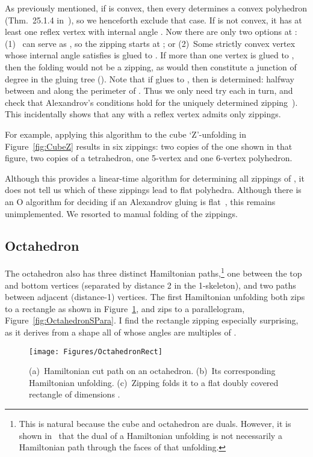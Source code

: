 \pdfoutput=1  \documentclass[]{article}
\newcommand{\figlab}[1]{\label{fig:#1}}
\newcommand{\figref}[1]{\ref{fig:#1}}
\begin{document}
As previously mentioned, if  is convex, then every  determines a
convex polyhedron (Thm.~25.1.4 in~\cite{do-gfalop-07}), so we henceforth exclude that case.
If  is not convex, it has at least one reflex vertex  with
internal angle .
Now there are only two options at :
(1)~ can serve as , so the zipping starts at ; or
(2)~Some strictly convex vertex  whose internal angle 
satisfies  is glued to .
If more than one vertex is glued to , then the folding would not be
a zipping, as  would then constitute a junction of degree 
in the gluing tree (\cite[Sec.~25.3]{do-gfalop-07}).
Note that if  glues to , then  is determined: halfway between 
and  along the perimeter of .
Thus we only need try each  in turn, and check that
Alexandrov's conditions hold for the uniquely determined zipping~\cite[Thm.~23.3.1]{do-gfalop-07}).
This incidentally shows that any  with a reflex vertex admits
only  zippings.

For example, applying this algorithm to the cube `Z'-unfolding
in Figure~\figref{CubeZ} results in six zippings: two copies of the
one shown in that figure, two copies of a tetrahedron, one
5-vertex and one 6-vertex polyhedron.

Although this provides a linear-time algorithm for determining all
zippings of , it does not tell us which of these zippings lead
to flat polyhedra.
Although there is an O algorithm for deciding if an
Alexandrov gluing is flat~\cite{o-ofpat-10}, this remains
unimplemented.
We resorted to manual folding of the zippings.

\subsection{Octahedron}
The octahedron also has three distinct Hamiltonian paths,\footnote{
   This is natural because the cube and octahedron are duals.
   However, it is shown in~\cite[Fig.~4]{lddss-zupc-10}
   that the dual of a Hamiltonian unfolding is not necessarily
   a Hamiltonian path through the faces of that unfolding.
}
one between
the top and bottom vertices (separated by distance 2 in the
1-skeleton), and two paths between adjacent (distance-1) vertices.
The first Hamiltonian unfolding both zips to a rectangle as shown
in Figure~\figref{OctahedronRect},
and zips to a parallelogram, Figure~\figref{OctahedronSPara}.
I find the rectangle zipping especially surprising, as it derives from
a shape all of whose angles are multiples of .
\begin{figure}[htbp]
\centering
\texttt{[image: Figures/OctahedronRect]}
\caption{(a)~Hamiltonian cut path on an octahedron.
(b)~Its corresponding Hamiltonian unfolding.
(c)~Zipping folds it to
a flat doubly covered rectangle
of dimensions .}
\figlab{OctahedronRect}
\end{figure}
\end{document}
